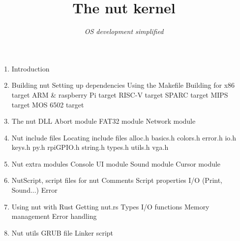 \documentclass{article}
\title{The nut kernel}
\author{\textit{OS development simplified}}
\date{}
\begin{document}
  \maketitle
  \newpage

  \begin{enumerate}
  	\LARGE \item Introduction
  	\\
  	\LARGE \item Building nut
    \Large \subitem Setting up dependencies
    \Large \subitem Using the Makefile
  	\Large \subitem Building for x86 target
  	\Large \subitem ARM \& raspberry Pi target
  	\Large \subitem RISC-V target
  	\Large \subitem SPARC target
  	\Large \subitem MIPS target
  	\Large \subitem MOS 6502 target

  	\LARGE \item The nut DLL
  	\Large \subitem Abort module
    \Large \subitem FAT32 module
    \Large \subitem Network module

  	\LARGE \item Nut include files
    \Large \subitem Locating include files
    \Large \subitem alloc.h
    \Large \subitem basics.h
    \Large \subitem colors.h
    \Large \subitem error.h
    \Large \subitem io.h
    \Large \subitem keys.h
    \Large \subitem py.h
    \Large \subitem rpiGPIO.h
    \Large \subitem string.h
    \Large \subitem types.h
    \Large \subitem utils.h
    \Large \subitem vga.h

    \LARGE \item Nut extra modules
    \Large \subitem Console UI module
    \Large \subitem Sound module
    \Large \subitem Cursor module

  	\LARGE \item NutScript, script files for nut
  	\Large \subitem Comments
    \Large \subitem Script properties
    \Large \subitem I/O (Print, Sound...)
    \Large \subitem Error

    \LARGE \item Using nut with Rust
    \Large \subitem Getting nut.rs
    \Large \subitem Types
    \Large \subitem I/O functions
    \Large \subitem Memory management
    \Large \subitem Error handling

    \LARGE \item Nut utils
    \Large \subitem GRUB file
    \Large \subitem Linker script
  \end{enumerate}
\end{document}
